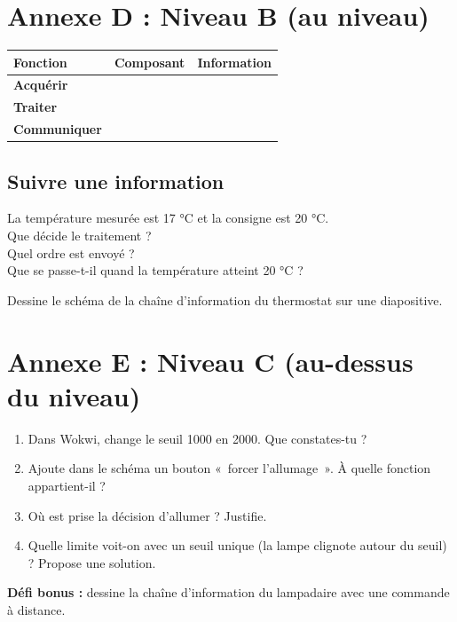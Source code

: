 \documentclass[11pt,a4paper]{article}
\begin{document}
\newpage
\section*{Annexe D : Niveau B (au niveau)}

\begin{tabularx}{\linewidth}{>{\bfseries}p{3.4cm}Y Y}
\toprule
Fonction & Composant & Information\\
\midrule
Acquérir & & \\
Traiter & & \\
Communiquer & & \\
\bottomrule
\end{tabularx}

\subsection*{Suivre une information}
La température mesurée est 17 °C et la consigne est 20 °C.\\
Que décide le traitement ? \dotfill\\
Quel ordre est envoyé ? \dotfill\\
Que se passe-t-il quand la température atteint 20 °C ? \dotfill

Dessine le schéma de la chaîne d'information du thermostat sur une diapositive.

\newpage
\section*{Annexe E : Niveau C (au-dessus du niveau)}

\begin{enumerate}
 \item Dans Wokwi, change le seuil 1000 en 2000. Que constates-tu ? \lig
 \item Ajoute dans le schéma un bouton «~forcer l'allumage~». À quelle fonction appartient-il ? \dotfill
 \item Où est prise la décision d'allumer ? Justifie. \lig
 \item Quelle limite voit-on avec un seuil unique (la lampe clignote autour du seuil) ? Propose une solution. \lig
\end{enumerate}

\textbf{Défi bonus :} dessine la chaîne d'information du lampadaire avec une commande à distance.
\end{document}
